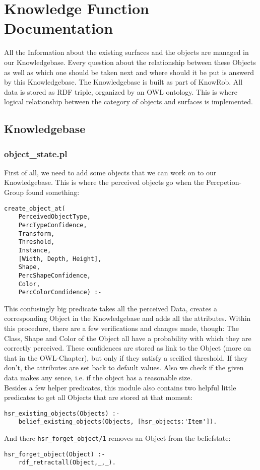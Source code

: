 \documentclass[main.tex]{subfiles}
\begin{document}
	\begingroup

	\renewcommand{\cleardoublepage}{}

	\renewcommand{\clearpage}{}

	\chapter{Knowledge Function Documentation}


All the Information about the existing surfaces and the objects are managed in our Knowledgebase. Every question about the relationship between these Objects as well as which one should be taken next and where should it be put is answerd by this Knowledgebase. The Knowledgebase is built as part of KnowRob. All data is stored as RDF triple, organized by an OWL ontology. This is where logical relationship between the category of objects and surfaces is implemented. 
		
\section{Knowledgebase}

\subsection{object\_state.pl}

First of all, we need to add some objects that we can work on to our Knowledgebase. This is where the perceived objects go when the Percpetion-Group found something:

\begin{lstlisting}
create_object_at(
	PerceivedObjectType, 
	PercTypeConfidence, 
	Transform, 
	Threshold, 
	Instance, 
	[Width, Depth, Height], 
	Shape, 
	PercShapeConfidence, 
	Color, 
	PercColorCondidence) :-
\end{lstlisting}
This confusingly big predicate takes all the perceived Data, creates a corresponding Object in the Knowledgebase and adds all the attributes. Within this procedure, there are a few verifications and changes made, though: The Class, Shape and Color of the Object all have a probability with which they are correctly perceived. These confidences are stored as link to the Object (more on that in the OWL-Chapter), but only if they satisfy a secified threshold. If they don't, the attributes are set back to default values. Also we check if the given data makes any sence, i.e. if the object has a reasonable size.\\
Besides a few helper predicates, this module also contains two helpful little predicates to get all Objects that are stored at that moment:
\begin{lstlisting}
hsr_existing_objects(Objects) :-
    belief_existing_objects(Objects, [hsr_objects:'Item']).
\end{lstlisting}
And there \texttt{hsr\_forget\_object/1} removes an Object from the beliefstate:
\begin{lstlisting}
hsr_forget_object(Object) :-
    rdf_retractall(Object,_,_).
\end{lstlisting}
\end{document}
